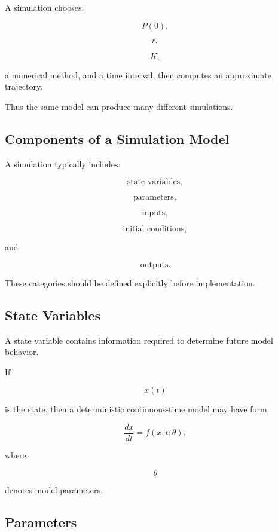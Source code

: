 A simulation chooses:

\[
\boxed{
P(0),
}
\]

\[
\boxed{
r,
}
\]

\[
\boxed{
K,
}
\]

a numerical method, and a time interval, then computes an approximate
trajectory.

Thus the same model can produce many different simulations.

\subsection{Components of a Simulation Model}
\label{subsec:simulation-model-components}

A simulation typically includes:

\[
\boxed{
\text{state variables},
}
\]

\[
\boxed{
\text{parameters},
}
\]

\[
\boxed{
\text{inputs},
}
\]

\[
\boxed{
\text{initial conditions},
}
\]

and

\[
\boxed{
\text{outputs}.
}
\]

These categories should be defined explicitly before implementation.

\subsection{State Variables}
\label{subsec:simulation-state-variables}

A state variable contains information required to determine future model
behavior.

If

\[
x(t)
\]

is the state, then a deterministic continuous-time model may have form

\[
\boxed{
\frac{dx}{dt}
=
f(x,t;\theta),
}
\]

where

\[
\theta
\]

denotes model parameters.

\subsection{Parameters}
\label{subsec:simulation-parameters}


